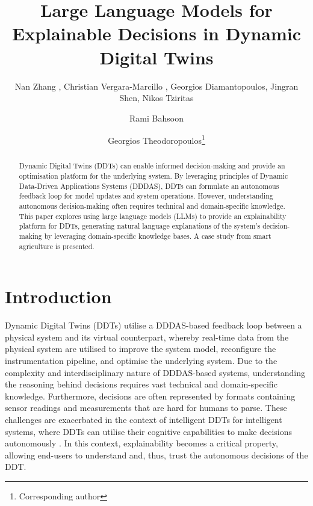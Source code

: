 \documentclass[runningheads]{llncs}
\begin{document}
\title{Large Language Models for Explainable Decisions in Dynamic Digital Twins}

\author{Nan Zhang , Christian Vergara-Marcillo , Georgios Diamantopoulos, Jingran Shen, Nikos Tziritas  \and Rami Bahsoon  \and Georgios Theodoropoulos\thanks{Corresponding author}}


  \maketitle              %


\begin{abstract}
Dynamic Digital Twins (DDTs) can enable informed decision-making and provide an optimisation platform for the underlying system. By leveraging principles of Dynamic Data-Driven Applications Systems (DDDAS), DDTs can formulate an autonomous feedback loop for model updates and system operations. However, understanding autonomous decision-making often requires technical and domain-specific knowledge. 
This paper explores using large language models (LLMs) to provide an explainability platform for DDTs, generating natural language explanations of the system’s decision-making by leveraging domain-specific knowledge bases. A case study from smart agriculture is presented. 
\end{abstract}


\setcounter{footnote}{0} 

\section{Introduction}
\vspace{-.2cm}

Dynamic Digital Twins (DDTs) utilise a DDDAS-based feedback loop between a physical system and its virtual counterpart, whereby real-time data from the physical system are utilised to improve the system model, reconfigure the instrumentation pipeline, and optimise the underlying system. 
Due to the complexity and interdisciplinary nature of DDDAS-based systems, understanding the reasoning behind decisions requires vast technical and domain-specific knowledge. Furthermore, decisions are often represented by formats containing sensor readings and measurements that are hard for humans to parse. These challenges are exacerbated in the context of intelligent DDTs for intelligent systems, where DDTs can utilise their cognitive capabilities to make decisions autonomously \cite{9283357}. In this context, explainability becomes a critical property, allowing end-users to understand and, thus, trust the autonomous decisions of the DDT.
\end{document}
